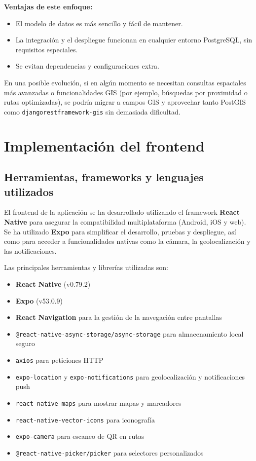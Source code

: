\textbf{Ventajas de este enfoque:}
\begin{itemize}
    \item El modelo de datos es más sencillo y fácil de mantener.
    \item La integración y el despliegue funcionan en cualquier entorno PostgreSQL, sin requisitos especiales.
    \item Se evitan dependencias y configuraciones extra.
\end{itemize}

En una posible evolución, si en algún momento se necesitan consultas espaciales más avanzadas o funcionalidades GIS (por ejemplo, búsquedas por proximidad o rutas optimizadas), se podría migrar a campos GIS y aprovechar tanto PostGIS como \mbox{\texttt{djangorestframework-gis}} sin demasiada dificultad.
\section{Implementación del frontend}

\subsection{Herramientas, frameworks y lenguajes utilizados}

El frontend de la aplicación se ha desarrollado utilizando el framework \textbf{React Native} para asegurar la compatibilidad multiplataforma (Android, iOS y web). Se ha utilizado \textbf{Expo} para simplificar el desarrollo, pruebas y despliegue, así como para acceder a funcionalidades nativas como la cámara, la geolocalización y las notificaciones.

Las principales herramientas y librerías utilizadas son:
\begin{itemize}
    \item \textbf{React Native} (v0.79.2)
    \item \textbf{Expo} (v53.0.9)
    \item \textbf{React Navigation} para la gestión de la navegación entre pantallas
    \item \texttt{@react-native-async-storage/async-storage} para almacenamiento local seguro
    \item \texttt{axios} para peticiones HTTP
    \item \texttt{expo-location} y \texttt{expo-notifications} para geolocalización y notificaciones push
    \item \texttt{react-native-maps} para mostrar mapas y marcadores
    \item \texttt{react-native-vector-icons} para iconografía
    \item \texttt{expo-camera} para escaneo de QR en rutas
    \item \texttt{@react-native-picker/picker} para selectores personalizados
\end{itemize}

